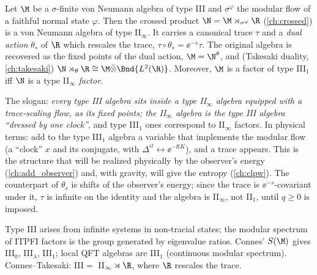 \begin{theorem}
Let $\M$ be a $\sigma$-finite von Neumann algebra of type III and $\sigma^\varphi$ the modular flow of a faithful normal state $\varphi$. Then the crossed product $\N=\M\rtimes_{\sigma^\varphi}\R$ (\cref{ch:crossed}) is a von Neumann algebra of type II$_\infty$. It carries a canonical trace $\tau$ and a \emph{dual action} $\theta_s$ of $\R$ which rescales the trace, $\tau\circ\theta_s=\ee^{-s}\tau$. The original algebra is recovered as the fixed points of the dual action, $\M=\N^{\theta}$, and (Takesaki duality, \cref{ch:takesaki}) $\N\rtimes_\theta\R\cong\M\bar\otimes\Bnd{L^2(\R)}$. Moreover, $\M$ is a factor of type III$_1$ iff $\N$ is a type II$_\infty$ \emph{factor}.
\end{theorem}
The slogan: \emph{every type III algebra sits inside a type II$_\infty$ algebra equipped with a trace-scaling flow, as its fixed points; the II$_\infty$ algebra is the type III algebra ``dressed by one clock''}, and type III$_1$ ones correspond to II$_\infty$ factors. In physical terms: add to the type III$_1$ algebra a variable that implements the modular flow (a ``clock'' $x$ and its conjugate, with $\Delta^{it}\leftrightarrow\ee^{-\ii tK}$), and a trace appears. This is the structure that will be realized physically by the observer's energy (\cref{ch:add_observer}) and, with gravity, will give the entropy (\cref{ch:clpw}). The counterpart of $\theta_s$ is shifts of the observer's energy; since the trace is $\ee^{-s}$-covariant under it, $\tau$ is infinite on the identity and the algebra is II$_\infty$, not II$_1$, until $q\ge0$ is imposed.

\begin{keyidea}
Type III arises from infinite systems in non-tracial states; the modular spectrum of ITPFI factors is the group generated by eigenvalue ratios. Connes' $S(\M)$ gives III$_0$, III$_\lambda$, III$_1$; local QFT algebras are III$_1$ (continuous modular spectrum). Connes--Takesaki: III$=$ II$_\infty\rtimes\R$, where $\R$ rescales the trace.
\end{keyidea}

